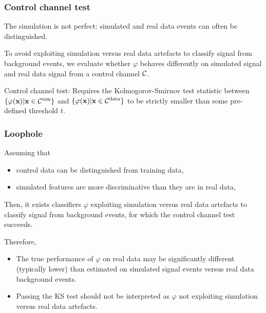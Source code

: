 \documentclass{beamer}
\begin{document}
\begin{frame}
\frametitle{Control channel test}

The simulation is not perfect: {\color{red} simulated and real data events can
often be distinguished}.

\vspace{1cm}

To avoid exploiting simulation versus real data artefacts to classify signal
from background events, we {\color{blue}evaluate whether $\varphi$ behaves
differently on simulated signal and real data signal from a control channel
${\cal C}$}.

\vspace{1cm}

Control channel test: Requires the Kolmogorov-Smirnov test statistic between $\{
\varphi(\mathbf{x}) | \mathbf{x} \in {\cal C}^\text{sim} \}$ and $\{
\varphi(\mathbf{x}) | \mathbf{x} \in {\cal C}^\text{data} \}$ to be strictly
smaller than some pre-defined threshold $t$.

\end{frame}


\begin{frame}
\frametitle{Loophole}

Assuming that
\begin{itemize}
\item control data can be distinguished from training data,
\item simulated features are more discriminative than they are in real data,
\end{itemize}

Then, it exists classifiers $\varphi$ exploiting simulation versus real data
artefacts to classify signal from background events, for which {\color{red}the
control channel test succeeds}.

\vspace{0.5cm}

Therefore,

\begin{itemize}

\item The true performance of $\varphi$ on real data may be significantly
different (typically lower) than estimated on simulated signal events versus
real data background events.

\item Passing the KS test should not be interpreted as $\varphi$
not exploiting simulation versus real data artefacts.

\end{itemize}

\end{frame}
\end{document}
